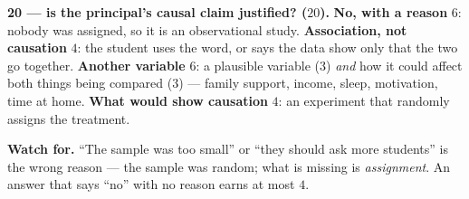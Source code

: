 \documentclass[10pt]{article}
\begin{document}
\begin{teachernote}
\scriptsize
\textbf{20 --- is the principal's causal claim justified? ($20$).}
\textbf{No, with a reason} $6$: nobody was assigned, so it is an observational study.
\textbf{Association, not causation} $4$: the student uses the word, or says the data show only
that the two go together.
\textbf{Another variable} $6$: a plausible variable ($3$) \emph{and} how it could affect both
things being compared ($3$) --- family support, income, sleep, motivation, time at home.
\textbf{What would show causation} $4$: an experiment that randomly assigns the treatment.

\vspace{2pt}
\textbf{Watch for.} ``The sample was too small'' or ``they should ask more students'' is the
wrong reason --- the sample was random; what is missing is \emph{assignment}. An answer that
says ``no'' with no reason earns at most $4$.
\end{teachernote}
\end{document}
